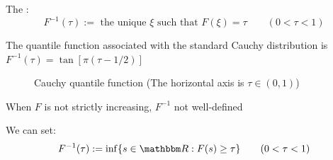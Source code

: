 \begin{frame}

    \vspace{2em}
    The :
    \begin{equation*}
        \label{eq:quantwi}
        F^{-1}(\tau) := \text{ the unique } \xi \text{ such that } F(\xi) = \tau
        \qquad (0 < \tau < 1)
    \end{equation*}
    
    
    \vspace{.7em}
    \Eg
    The quantile function associated with the standard Cauchy distribution  
    is $F^{-1}(\tau) = \tan [\pi(\tau - 1/2)]$

\end{frame}

\begin{frame}

    \begin{figure}
   \begin{center}
    \caption{\label{f:cauchy_quant} Cauchy quantile function (The horizontal axis is $\tau \in
    (0, 1)$)}
   \end{center}
\end{figure}

\end{frame}

\begin{frame}

    \vspace{2em}
    When $F$ is not strictly increasing, $F^{-1}$ not well-defined
    
    \vspace{1em}
    We can set:
    \begin{equation}
        \label{eq:quantwi2}
        F^{-1}(\tau) := \inf \setntn{s \in \RR}{F(s) \geq \tau}
        \qquad (0 < \tau < 1)
    \end{equation}
\end{frame}

